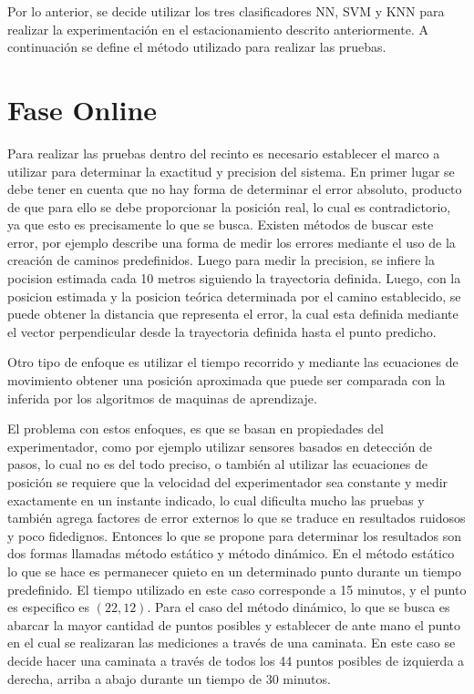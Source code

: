 Por lo anterior, se decide utilizar los tres clasificadores NN, SVM y KNN para realizar la experimentación en el estacionamiento descrito anteriormente. A continuación se define el método utilizado para realizar las pruebas.


\section{Fase Online}

Para realizar las pruebas dentro del recinto es necesario establecer el marco a utilizar para determinar la exactitud y precision del sistema. En primer lugar se debe tener en cuenta que no hay forma de determinar el error absoluto, producto de que para ello se debe proporcionar la posición real, lo cual es contradictorio, ya que esto es precisamente lo que se busca. Existen métodos de buscar este error, por ejemplo \citep{Ugave} describe una forma de medir los errores mediante el uso de la creación de caminos predefinidos. Luego para medir la precision, se infiere la pocision estimada cada 10 metros siguiendo la trayectoria definida. Luego, con la posicion estimada y la posicion teórica determinada por el camino establecido, se puede obtener la distancia que representa el error, la cual esta definida mediante el vector perpendicular desde la trayectoria definida hasta el punto predicho. 

Otro tipo de enfoque es utilizar el tiempo recorrido y mediante las ecuaciones de movimiento obtener una posición aproximada que puede ser comparada con la inferida por los algoritmos de maquinas de aprendizaje.

El problema con estos enfoques, es que se basan en propiedades del experimentador, como por ejemplo utilizar sensores basados en detección de pasos, lo cual no es del todo preciso, o también al utilizar las ecuaciones de posición se requiere que la velocidad del experimentador sea constante y medir exactamente en un instante indicado, lo cual dificulta mucho las pruebas y también agrega factores de error externos lo que se traduce en resultados ruidosos y poco fidedignos. Entonces lo que se propone para determinar los resultados son dos formas llamadas método estático y método dinámico. En el método estático lo que se hace es permanecer quieto en un determinado punto durante un tiempo predefinido. El tiempo utilizado en este caso corresponde a 15 minutos, y el punto es especifico es $(22, 12)$. Para el caso del método dinámico, lo que se busca es abarcar la mayor cantidad de puntos posibles y establecer de ante mano el punto en el cual se realizaran las mediciones a través de una caminata. En este caso se decide hacer una caminata a través de todos los 44 puntos posibles de izquierda a derecha, arriba a abajo durante un tiempo de 30 minutos.

